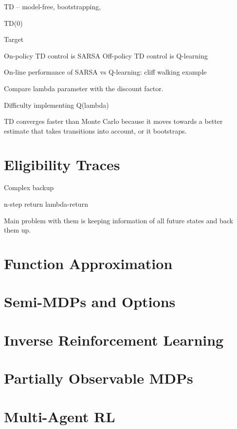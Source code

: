 \documentclass[twocolumn]{article}
\begin{document}
TD -- model-free, bootstrapping, 

TD(0)

Target 

On-policy TD control is SARSA
Off-policy TD control is Q-learning

On-line performance of SARSA vs Q-learning: cliff walking example

Compare lambda parameter with the discount factor.

Difficulty implementing Q(lambda)



TD converges faster than Monte Carlo because it moves towards a better estimate that takes transitions into account, or it bootstraps. 

\section{Eligibility Traces}

Complex backup

n-step return
lambda-return

Main problem with them is keeping information of all future states and back them up.




\section{Function Approximation}

\section{Semi-MDPs and Options}

\section{Inverse Reinforcement Learning}

\section{Partially Observable MDPs}

\section{Multi-Agent RL}
\end{document}
